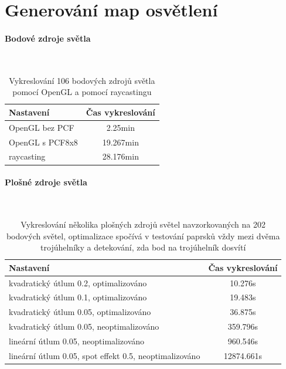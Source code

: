 \documentclass[11pt,twoside,a4paper]{book}
\begin{document}
\section{Generování map osvětlení}
\paragraph{Bodové zdroje světla}\ \ \\
\begin{table}[h!]
\begin{center}
\begin{tabular}{|p{50mm}|c|}
\hline
\textbf{Nastavení} & \textbf{Čas vykreslování} \\
\hline
OpenGL bez PCF & 2.25min\\ \hline
OpenGL s PCF8x8 & 19.267min\\ \hline
raycasting & 28.176min\\ \hline
\end{tabular}
\caption{Vykreslování 106 bodových zdrojů světla pomocí OpenGL a pomocí raycastingu}
\end{center}
\end{table}

\paragraph{Plošné zdroje světla}\ \ \\
\begin{table}[h!]
\begin{center}
\begin{tabular}{|p{100mm}|c|}
\hline
\textbf{Nastavení} & \textbf{Čas vykreslování} \\
\hline
kvadratický útlum 0.2, optimalizováno & 10.276s\\ \hline
kvadratický útlum 0.1, optimalizováno & 19.483s\\ \hline
kvadratický útlum 0.05, optimalizováno & 36.875s\\ \hline
kvadratický útlum 0.05, neoptimalizováno & 359.796s\\ \hline
lineární útlum 0.05, neoptimalizováno & 960.546s\\ \hline
lineární útlum 0.05, spot effekt 0.5, neoptimalizováno & 12874.661s\\ \hline
\end{tabular}
\caption{Vykreslování několika plošných zdrojů světel navzorkovaných na 202 bodových světel, optimalizace spočívá v testování paprsků vždy mezi dvěma trojúhelníky a detekování, zda bod na trojúhelník dosvítí }
\end{center}
\end{table}
\end{document}
